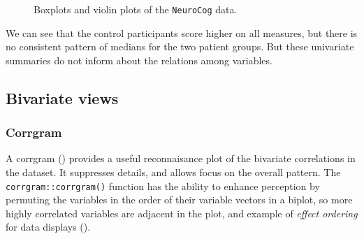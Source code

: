 \documentclass[
  letterpaper,
  10pt,
  krantz2]{krantz}
\begin{document}
\begin{figure}[H]


\caption{\label{fig-NC-boxplot}Boxplots and violin plots of the
\texttt{NeuroCog} data.}

\end{figure}%

We can see that the control participants score higher on all measures,
but there is no consistent pattern of medians for the two patient
groups. But these univariate summaries do not inform about the relations
among variables.

\subsection{Bivariate views}\label{bivariate-views}

\subsubsection*{Corrgram}\label{corrgram}

A corrgram ()
provides a useful reconnaisance plot of the bivariate correlations in
the dataset. It suppresses details, and allows focus on the overall
pattern. The \texttt{corrgram::corrgram()} function has the ability to
enhance perception by permuting the variables in the order of their
variable vectors in a biplot, so more highly correlated variables are
adjacent in the plot, and example of \emph{effect ordering} for data
displays ().
\end{document}
